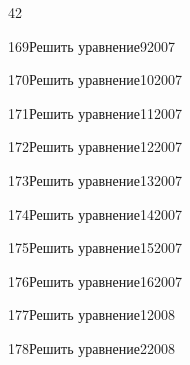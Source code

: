 \begin{TrigSourcePage}{42}
\begin{TrigExercise}{169}{Решить уравнение}{9}{2007}
\end{TrigExercise}
\begin{TrigExercise}{170}{Решить уравнение}{10}{2007}
\end{TrigExercise}
\begin{TrigExercise}{171}{Решить уравнение}{11}{2007}
\end{TrigExercise}
\begin{TrigExercise}{172}{Решить уравнение}{12}{2007}
\end{TrigExercise}
\begin{TrigExercise}{173}{Решить уравнение}{13}{2007}
\end{TrigExercise}
\begin{TrigExercise}{174}{Решить уравнение}{14}{2007}
\end{TrigExercise}
\begin{TrigExercise}{175}{Решить уравнение}{15}{2007}
\end{TrigExercise}
\begin{TrigExercise}{176}{Решить уравнение}{16}{2007}
\end{TrigExercise}
\begin{TrigExercise}{177}{Решить уравнение}{1}{2008}
\end{TrigExercise}
\begin{TrigExercise}{178}{Решить уравнение}{2}{2008}
\end{TrigExercise}

\end{TrigSourcePage}
